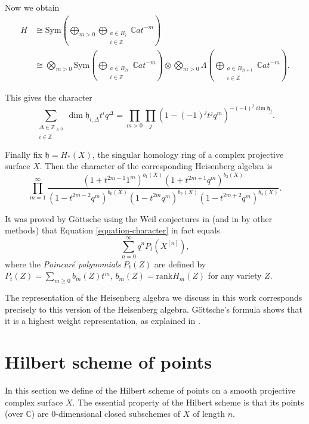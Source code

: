 Now we obtain
\begin{align*}
H&\cong \text{Sym}\left(\bigoplus_{m>0}\bigoplus
_{\substack{a \in B_i \\ i \in \mathbb{Z}}}
\mathbb{C}at^{-m}\right)\\
&\cong \bigotimes_{m>0}\text{Sym}\left(\bigoplus
_{\substack{a \in B_{2i} \\ i \in \mathbb{Z}}}
\mathbb{C}at^{-m}\right)
\otimes\bigotimes_{m>0}
\Lambda\left(\bigoplus_{
\substack{a \in B_{2i+1} \\ i \in \mathbb{Z}}}
\mathbb{C}at^{-m}\right).
\end{align*}

\noindent
This gives the character
$$
\sum_{\substack{\Delta\in \mathbb{Z}_{\geq 0}  \\ i \in \mathbb{Z}}}
\dim \mathfrak{h}_{i,\Delta}t^iq^\Delta
=\prod_{m>0}\prod_j(1-(-1)^jt^jq^m)^{-(-1)^j\dim \mathfrak{h}_j}.
$$

\noindent
Finally fix $\mathfrak{h}=H_*(X)$, the singular homology ring
of a complex projective surface $X$.
Then the character of the corresponding Heisenberg algebra is
\begin{equation}
\label{equation-character}
\prod_{m=1}^\infty \frac{
(1+t^{2m-1}1^m)^{b_1(X)}
(1+t^{2m+1}q^m)^{b_3(X)}}
{(1-t^{2m-2}q^m)^{b_0(X)}
(1-t^{2m}q^m)^{b_2(X)}
(1-t^{2m+2}q^m)^{b_4(X)}}.
\end{equation}

\noindent
It was proved by Göttsche using the Weil conjectures in \cite{Gottsche1990} 
(and in \cite[Section 6.2]{Nakajima-lectures} by other methods)
that Equation \ref{equation-character}
in fact equals
$$
\sum_{n=0}^\infty q^nP_t(X^{[n]}),
$$
where the {\it Poincaré polynomials} $P_t(Z)$ are defined by
$P_t(Z)=\sum_{m\geq 0}b_m(Z)t^m$, $b_m(Z)=\text{rank}H_m(Z)$ for
any variety $Z$.

The representation
of the Heisenberg algebra we discuss in this work corresponds
precisely to this version of the Heisenberg algebra.
Göttsche's formula shows that it is a highest weight representation,
as explained in \cite[Corollary 8.16]{Nakajima-lectures}.




\section{Hilbert scheme of points}
\label{section-hilbert-scheme}

\noindent
In this section we define 
of the Hilbert scheme of points
on a smooth projective complex surface $X$.
The essential property of the Hilbert scheme
is that its points (over $\mathbb{C}$) 
are 0-dimensional closed subschemes of $X$
of length $n$.

